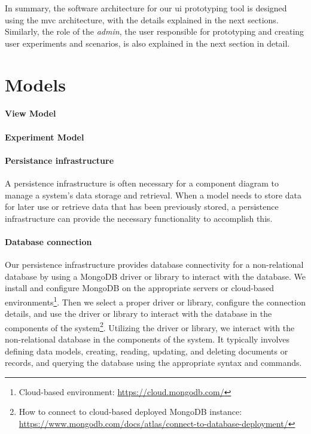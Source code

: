 In summary, the software architecture for our \ac{ui} prototyping tool is designed using the \ac{mvc} architecture, with the details explained in the next sections. 
Similarly, the role of the \textit{admin}, the user responsible for prototyping and creating user experiments and scenarios, is also explained in the next section in detail.

\clearpage
\section{Models}
\label{sc:section:persistance}

\paragraph{View Model}

\paragraph{Experiment Model}

\paragraph{Persistance infrastructure}
A persistence infrastructure is often necessary for a component diagram to manage a system's data storage and retrieval. 
When a model needs to store data for later use or retrieve data that has been previously stored, a persistence infrastructure can provide the necessary functionality to accomplish this.

\paragraph{Database connection}
Our persistence infrastructure provides database connectivity for a non-relational database by using a MongoDB driver or library to interact with the database. 
We install and configure MongoDB on the appropriate servers or cloud-based environments\footnote{Cloud-based environment: \url{https://cloud.mongodb.com/}}.
Then we select a proper driver or library, configure the connection details, and use the driver or library to interact with the database in the components of the system\footnote{How to connect to cloud-based deployed MongoDB instance: \url{https://www.mongodb.com/docs/atlas/connect-to-database-deployment/}}.
Utilizing the driver or library, we interact with the non-relational database in the components of the system. It typically involves defining data models, creating, reading, updating, and deleting documents or records, and querying the database using the appropriate syntax and commands.

